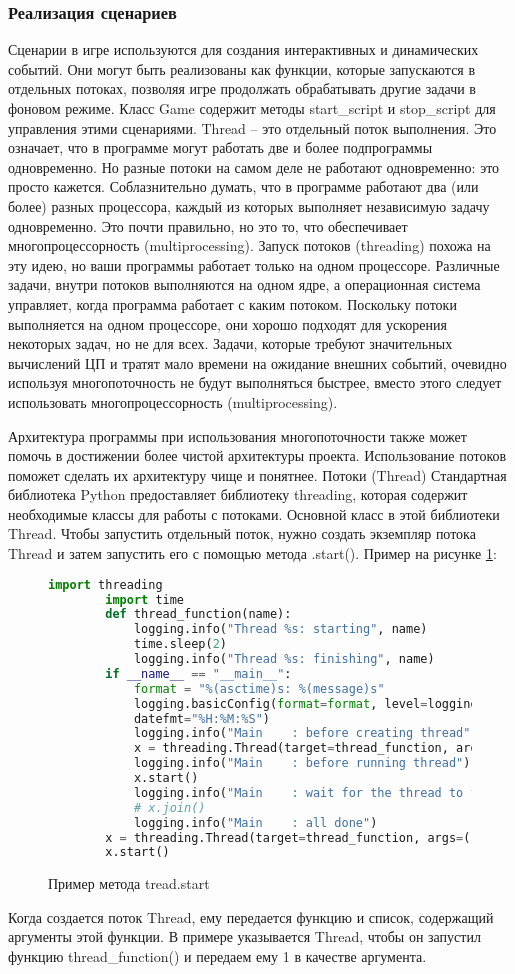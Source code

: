 \subsubsection{Реализация сценариев}
Сценарии в игре используются для создания интерактивных и динамических событий. Они могут быть реализованы как функции, которые запускаются в отдельных потоках, позволяя игре продолжать обрабатывать другие задачи в фоновом режиме. Класс Game содержит методы start\_script и stop\_script для управления этими сценариями. Thread – это отдельный поток выполнения. Это означает, что в программе могут работать две и более подпрограммы одновременно. Но разные потоки на самом деле не работают одновременно: это просто кажется.
Соблазнительно думать, что в программе работают два (или более) разных процессора, каждый из которых выполняет независимую задачу одновременно. Это почти правильно, но это то, что обеспечивает многопроцессорность (multiprocessing).
Запуск потоков (threading) похожа на эту идею, но ваши программы работает только на одном процессоре. Различные задачи, внутри потоков выполняются на одном ядре, а операционная система управляет, когда программа работает с каким потоком.
Поскольку потоки выполняется на одном процессоре, они хорошо подходят для ускорения некоторых задач, но не для всех. Задачи, которые требуют значительных вычислений ЦП и тратят мало времени на ожидание внешних событий, очевидно используя многопоточность не будут выполняться быстрее, вместо этого следует использовать многопроцессорность (multiprocessing).

Архитектура программы при использования многопоточности также может помочь в достижении более чистой архитектуры проекта. Использование потоков поможет сделать их архитектуру чище и понятнее.
Потоки (Thread)
Стандартная библиотека Python предоставляет библиотеку threading, которая содержит необходимые классы для работы с потоками. Основной класс в этой библиотеки Thread. Чтобы запустить отдельный поток, нужно создать экземпляр потока Thread и затем запустить его с помощью метода .start(). Пример на рисунке \ref{treading:image}:
\begin{figure}[H]
	\begin{lstlisting}[language=Python]
		import threading
		import time
		def thread_function(name):
			logging.info("Thread %s: starting", name)
			time.sleep(2)
			logging.info("Thread %s: finishing", name)
		if __name__ == "__main__":
			format = "%(asctime)s: %(message)s"
			logging.basicConfig(format=format, level=logging.INFO,
			datefmt="%H:%M:%S")
			logging.info("Main    : before creating thread")
			x = threading.Thread(target=thread_function, args=(1,))
			logging.info("Main    : before running thread")
			x.start()
			logging.info("Main    : wait for the thread to finish")
			# x.join()
			logging.info("Main    : all done")
		x = threading.Thread(target=thread_function, args=(1,))
		x.start()
	\end{lstlisting}  
	\caption{Пример метода tread.start}
	\label{treading:image}
\end{figure}
Когда создается поток Thread, ему передается функцию и список, содержащий аргументы этой функции. В примере указывается Thread, чтобы он запустил функцию thread\_function() и передаем ему 1 в качестве аргумента.

